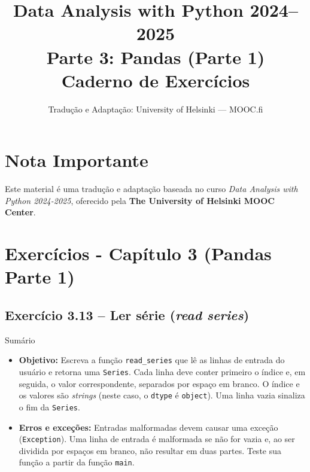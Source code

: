 \documentclass[11pt,a4paper]{article}
\title{\textbf{Data Analysis with Python 2024--2025}\\Parte 3: Pandas (Parte 1)\\\large Caderno de Exercícios}
\author{Tradução e Adaptação: University of Helsinki --- MOOC.fi}
\date{}
\begin{document}
\maketitle

\section*{Nota Importante}
Este material é uma tradução e adaptação baseada no curso \textit{Data Analysis with Python 2024-2025}, oferecido pela \textbf{The University of Helsinki MOOC Center}.

\tableofcontents
\newpage

\section{Exercícios - Capítulo 3 (Pandas Parte 1)}

\subsection*{Exercício 3.13 -- Ler série (\textit{read series})}
\begin{exercicio}{Sumário}
\begin{itemize}
    \item \textbf{Objetivo:} Escreva a função \texttt{read\_series} que lê as linhas de entrada do usuário e retorna uma \texttt{Series}. Cada linha deve conter primeiro o índice e, em seguida, o valor correspondente, separados por espaço em branco. O índice e os valores são \textit{strings} (neste caso, o \texttt{dtype} é \texttt{object}). Uma linha vazia sinaliza o fim da \texttt{Series}. 
    \item \textbf{Erros e exceções:} Entradas malformadas devem causar uma exceção (\texttt{Exception}). Uma linha de entrada é malformada se não for vazia e, ao ser dividida por espaços em branco, não resultar em duas partes. Teste sua função a partir da função \texttt{main}.
\end{itemize}
\end{exercicio}
\end{document}
